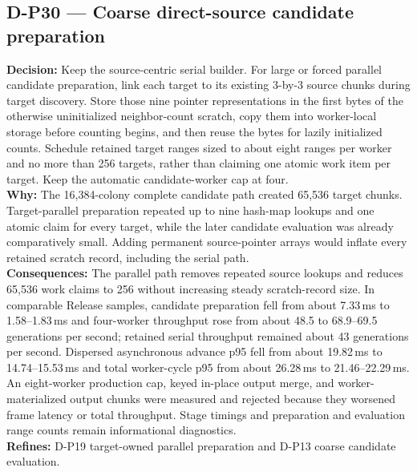\subsection*{D-P30 --- Coarse direct-source candidate preparation}
\begin{decisionbox}[title={D-P30 \quad 2026-08-11}]
\textbf{Decision:} Keep the source-centric serial builder. For large or forced
parallel candidate preparation, link each target to its existing 3-by-3 source
chunks during target discovery. Store those nine pointer representations in
the first bytes of the otherwise uninitialized neighbor-count scratch, copy
them into worker-local storage before counting begins, and then reuse the bytes
for lazily initialized counts. Schedule retained target ranges sized to about
eight ranges per worker and no more than 256 targets, rather than claiming one
atomic work item per target. Keep the automatic candidate-worker cap at four.\\
\textbf{Why:} The 16,384-colony complete candidate path created 65,536 target
chunks. Target-parallel preparation repeated up to nine hash-map lookups and
one atomic claim for every target, while the later candidate evaluation was
already comparatively small. Adding permanent source-pointer arrays would
inflate every retained scratch record, including the serial path.\\
\textbf{Consequences:} The parallel path removes repeated source lookups and
reduces 65,536 work claims to 256 without increasing steady scratch-record
size. In comparable Release samples, candidate preparation fell from about
7.33\,ms to 1.58--1.83\,ms and four-worker throughput rose from about 48.5 to
68.9--69.5 generations per second; retained serial throughput remained about
43 generations per second. Dispersed asynchronous advance p95 fell from about
19.82\,ms to 14.74--15.53\,ms and total worker-cycle p95 from about 26.28\,ms to
21.46--22.29\,ms. An eight-worker production cap, keyed in-place output merge, and
worker-materialized output chunks were measured and rejected because they
worsened frame latency or total throughput. Stage timings and preparation and
evaluation range counts remain informational diagnostics.\\
\textbf{Refines:} D-P19 target-owned parallel preparation and D-P13 coarse
candidate evaluation.
\end{decisionbox}

